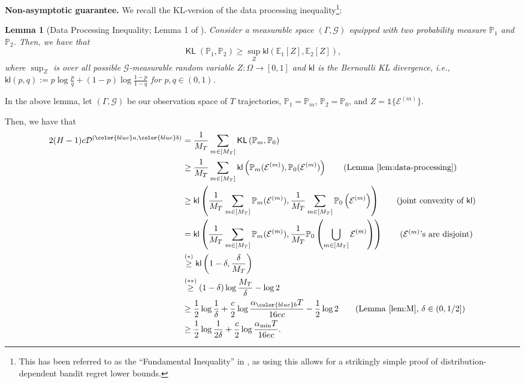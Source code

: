 \documentclass[twoside]{article}
\DeclareMathOperator{\KL}{{\mathsf{KL}}}
\def\kl{{\mathsf{kl}}}
\def\gD{{\mathcal{D}}}
\def\gE{{\mathcal{E}}}
\def\gG{{\mathcal{G}}}
\def\sP{{\mathbb{P}}}
\newcommand{\E}{\mathbb{E}}
\theoremstyle{plain}
\newtheorem{lemma}{Lemma}[section]
\newcommand{\indicator}{\mathds{1}}
\begin{document}
\vspace{0.2cm}
\textbf{Non-asymptotic guarantee.}
We recall the KL-version of the data processing inequality\footnote{This has been referred to as the ``Fundamental Inequality'' in \cite{garivier2019lower}, as using this allows for a strikingly simple proof of distribution-dependent bandit regret lower bounds.}:
\begin{lemma}[Data Processing Inequality; Lemma 1 of \cite{garivier2019lower}]
\label{lem:data-processing}
    Consider a measurable space $(\Gamma, \gG)$ equipped with two probability measure $\sP_1$ and $\sP_2$.
    Then, we have that
    \begin{equation}
        \KL(\sP_1, \sP_2) \geq \sup_Z \kl(\E_1[Z], \E_2[Z]),
    \end{equation}
    where $\sup_Z$ is over all possible $\gG$-measurable random variable $Z : \Omega \rightarrow [0, 1]$ and $\kl$ is the Bernoulli KL divergence, i.e., $\kl(p, q) := p \log\frac{p}{q} + (1 - p) \log\frac{1-p}{1-q}$ for $p, q \in (0, 1)$.
\end{lemma}
In the above lemma, let $(\Gamma, \gG)$ be our observation space of $T$ trajectories, $\sP_1 = \sP_m$, $\sP_2 = \sP_0$, and $Z = \indicator\lbrace \gE^{(m)}\rbrace$.

Then, we have that
\begin{align*}
    2 (H - 1) c \gD^{({\color{blue}a}, {\color{blue}b})} &= \frac{1}{M_T} \sum_{m \in [M_T]} \KL\left( \sP_m, \sP_0 \right) \\
    &\geq \frac{1}{M_T} \sum_{m \in [M_T]} \kl\left( \sP_m(\gE^{(m)}), \sP_0(\gE^{(m)}) \right) \tag{Lemma~\ref{lem:data-processing}} \\
    &\geq \kl\left( \frac{1}{M_T} \sum_{m \in [M_T]} \sP_m(\gE^{(m)}), \frac{1}{M_T} \sum_{m \in [M_T]} \sP_0\left( \gE^{(m)} \right) \right) \tag{joint convexity of $\kl$} \\
    &= \kl\left( \frac{1}{M_T} \sum_{m \in [M_T]} \sP_m(\gE^{(m)}), \frac{1}{M_T} \sP_0\left( \bigcup_{m \in [M_T]} \gE^{(m)} \right) \right) \tag{$\gE^{(m)}$'s are disjoint} \\
    &\overset{(*)}{\ge} \kl\left( 1 - \delta, \frac{\delta}{M_T} \right) \\ 
    &\overset{(**)}{\ge} (1 - \delta) \log \frac{M_T}{\delta} - \log 2 \\
    &\ge \frac{1}{2} \log \frac{1}{\delta} + \frac{c}{2} \log\frac{\alpha_{\color{blue} b} T}{16ec} - \frac{1}{2} \log 2 \tag{Lemma~\ref{lem:M}, $\delta \in (0, 1/2]$} \\
    &\ge \frac{1}{2} \log \frac{1}{2\delta} + \frac{c}{2} \log\frac{\alpha_{\min} T}{16ec}.
\end{align*}
\end{document}
